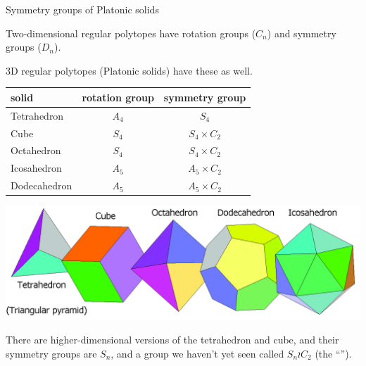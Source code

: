\documentclass[8pt, handout]{beamer}
\newcommand{\Pause}{}
\begin{document}
\begin{frame}{Symmetry groups of Platonic solids} %
  
  Two-dimensional regular polytopes have rotation groups ($C_n$) and
  symmetry groups ($D_n$). \medskip\Pause
  
  3D regular polytopes (Platonic solids) have these as well.  \medskip\Pause

  \begin{center}
  \begin{tabular}{|l|c|c|} \hline
    \textbf{solid} & \textbf{rotation group} & \textbf{symmetry group} \\
    \hline
    Tetrahedron & $A_4$ & $S_4$ \\ \hline
    Cube & $S_4$ & $S_4\times C_2$ \\
    Octahedron & $S_4$ & $S_4\times C_2$ \\ \hline
    Icosahedron & $A_5$ & $A_5\times C_2$ \\
    Dodecahedron & $A_5$ & $A_5\times C_2$ \\ \hline
  \end{tabular}
  \end{center}

  \vspace{-3mm}
  
  \begin{center}
    \includegraphics[width=.7\textwidth]{platonic-solids}
  \end{center}

  \Pause
  
  There are higher-dimensional versions of the tetrahedron and cube,
  and their symmetry groups are $S_n$, and a group we haven't yet seen
  called $S_n\wr C_2$ (the ``'').
  
\end{frame}

\end{document}

